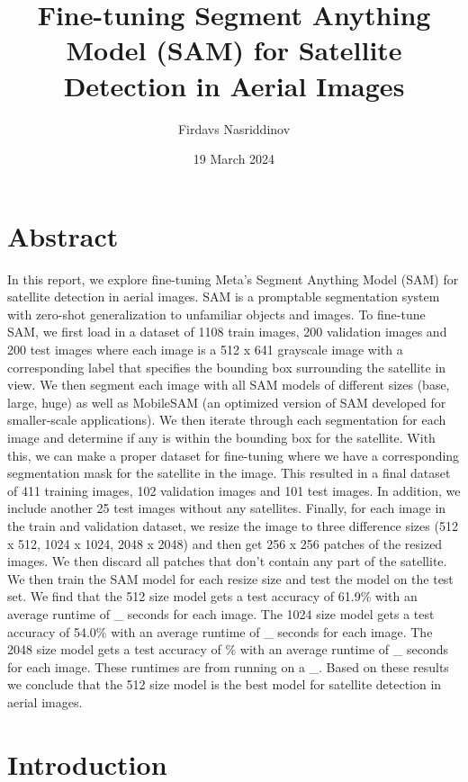 \documentclass{article}
\title{Fine-tuning Segment Anything Model (SAM) for Satellite Detection in Aerial Images}
\author{Firdavs Nasriddinov}
\date{19 March 2024}
\begin{document}
\maketitle{}

\section*{Abstract}

In this report, we explore fine-tuning Meta's Segment Anything Model (SAM) for satellite detection in aerial images. SAM is a promptable segmentation system with zero-shot generalization to unfamiliar objects and images. To fine-tune SAM, we first load in a dataset of 1108 train images, 200 validation images and 200 test images where each image is a 512 x 641 grayscale image with a corresponding label that specifies the bounding box surrounding the satellite in view. We then segment each image with all SAM models of different sizes (base, large, huge) as well as MobileSAM (an optimized version of SAM developed for smaller-scale applications). We then iterate through each segmentation for each image and determine if any is within the bounding box for the satellite. With this, we can make a proper dataset for fine-tuning where we have a corresponding segmentation mask for the satellite in the image. This resulted in a final dataset of 411 training images, 102 validation images and 101 test images. In addition, we include another 25 test images without any satellites. Finally, for each image in the train and validation dataset, we resize the image to three difference sizes (512 x 512, 1024 x 1024, 2048 x 2048) and then get 256 x 256 patches of the resized images. We then discard all patches that don't contain any part of the satellite. We then train the SAM model for each resize size and test the model on the test set. We find that the 512 size model gets a test accuracy of 61.9\% with an average runtime of \_ seconds for each image. The 1024 size model gets a test accuracy of 54.0\% with an average runtime of \_ seconds for each image. The 2048 size model gets a test accuracy of \% with an average runtime of \_ seconds for each image. These runtimes are from running on a \_. Based on these results we conclude that the 512 size model is the best model for satellite detection in aerial images.

\medskip

\section*{Introduction}
\end{document}
